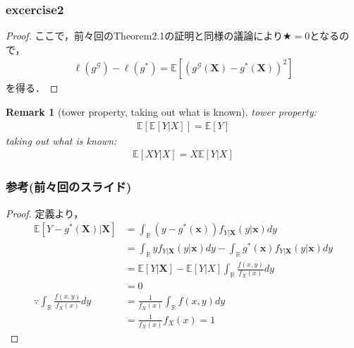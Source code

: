 \documentclass[dvipdfmx,cjk]{beamer}
\theoremstyle{example}
\newtheorem{remark}[thm]{Remark}
\begin{document}
\begin{frame}
    \frametitle{excercise2}
    \begin{proof}
        ここで，前々回のTheorem2.1の証明と同様の議論により$\bigstar=0$となるので，
        \begin{align*}
            \ell(g^\mathcal{G})-\ell(g^*)=\mathbb{E}\left[(g^\mathcal{G}(\boldsymbol{X})-g^*(\boldsymbol{X}))^2\right]
        \end{align*}
        を得る．
    \end{proof}
    \begin{remark}[tower property, taking out what is known]
        tower property:
        \begin{align*}
            \mathbb{E}[\mathbb{E}[Y|X]] = \mathbb{E}[Y]
        \end{align*}
        taking out what is known:
        \begin{align*}
            \mathbb{E}[XY|X]=X\mathbb{E}[Y|X]
        \end{align*}
    \end{remark}
\end{frame}
\begin{frame}
    \frametitle{参考(前々回のスライド)}
    \begin{proof}
        定義より，
        \begin{align*}
            \mathbb{E}[Y-g^*(\boldsymbol{X})|\boldsymbol{X}] & =\int_\mathbb{R}(y-g^*(\boldsymbol{x}))f_{Y|\boldsymbol{X}}(y|\boldsymbol{x})dy                                                      \\
                                                             & =\int_\mathbb{R}yf_{Y|\boldsymbol{X}}(y|\boldsymbol{x})dy-\int_\mathbb{R}g^*(\boldsymbol{x})f_{Y|\boldsymbol{X}}(y|\boldsymbol{x})dy \\
                                                             & = \mathbb{E}[Y|\boldsymbol{X}]-\mathbb{E}[Y|X]\int_\mathbb{R}\frac{f(x,y)}{f_X(x)}dy                                                 \\
                                                             & =0                                                                                                                                   \\
            \because\int_\mathbb{R}\frac{f(x,y)}{f_X(x)}dy   & =\frac{1}{f_X(x)}\int_\mathbb{R}f(x,y)dy                                                                                             \\
                                                             & =\frac{1}{f_X(x)}f_X(x)=1
        \end{align*}
        \renewcommand{\qedsymbol}{}
    \end{proof}
\end{frame}
\end{document}
